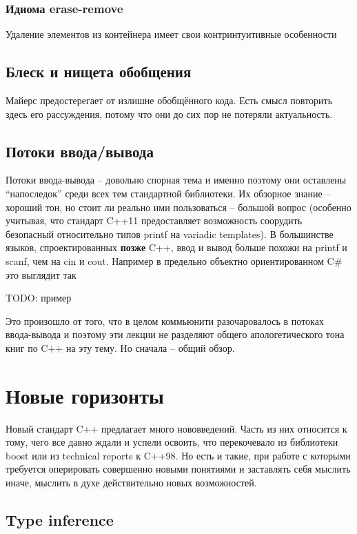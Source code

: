 \documentclass[a4paper,12pt,oneside]{article}
\begin{document}
\subsubsection{Идиома erase-remove}

Удаление элементов из контейнера имеет свои контринтуитивные особенности

\subsection{Блеск и нищета обобщения}

Майерс \cite{effectivestl} предостерегает от излишне обобщённого кода. Есть смысл повторить здесь его рассуждения, потому что они до сих пор не потеряли актуальность. 

\subsection{Потоки ввода/вывода}

Потоки ввода-вывода -- довольно спорная тема и именно поэтому они оставлены ``напоследок'' среди всех тем стандартной библиотеки. Их обзорное знание -- хороший тон, но стоит ли реально ими пользоваться -- большой вопрос (особенно учитывая, что стандарт C++11 предоставляет возможность соорудить безопасный относительно типов printf на variadic templates). В большинстве языков, спроектированных \textbf{позже} C++, ввод и вывод больше похожи на printf и scanf, чем на cin и cout. Например в предельно объектно ориентированном C\# это выглядит так

TODO: пример

Это произошло от того, что в целом коммьюнити разочаровалось в потоках ввода-вывода и поэтому эти лекции не разделяют общего апологетического тона книг по C++ на эту тему. Но сначала -- общий обзор.

\pagebreak
\section{Новые горизонты}

Новый стандарт C++ предлагает много нововведений. Часть из них относится к тому, чего все давно ждали и успели освоить, что перекочевало из библиотеки boost или из technical reports к C++98. Но есть и такие, при работе с которыми требуется оперировать совершенно новыми понятиями и заставлять себя мыслить иначе, мыслить в духе действительно новых возможностей.

\subsection{Type inference}
\end{document}
